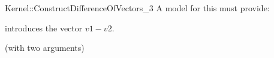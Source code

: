 \begin{ccRefFunctionObjectConcept}{Kernel::ConstructDifferenceOfVectors_3}
A model for this must provide:


            {introduces the vector $v1 - v2$.}

\ccRefines
{} (with two arguments)

\ccSeeAlso
{}\\

\end{ccRefFunctionObjectConcept}

